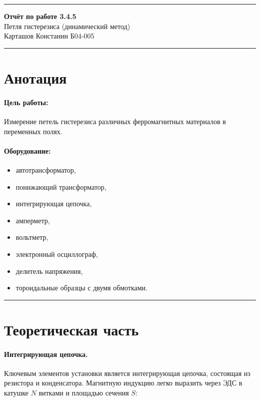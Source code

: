 \documentclass[a4paper,12pt]{article} %
\begin{document}


\hrule 	
\medskip
\begin{raggedright}
{\large \textbf{Отчёт по работе 3.4.5}}
\\
\medskip
{\Large Петля гистерезиса (динамический метод)} 
\\
\medskip
{\large Карташов Констанин Б04-005}
\medskip
\hrule
\medskip
\end{raggedright}


\section{Анотация}

\paragraph{Цель работы:} 
Измерение петель гистерезиса различных ферромагнитных материалов в переменных полях.

\paragraph{Оборудование:}
\begin{itemize}
\renewcommand{\labelitemi}{$\triangleright$}
\itemsep0em
\item автотрансформатор,
\item понижающий трансформатор,
\item интегрирующая цепочка,
\item амперметр,
\item вольтметр,
\item электронный осциллограф,
\item делитель напряжения,
\item тороидальные образцы с двумя обмотками.
\end{itemize}


\medskip\hrule\medskip

\section{Теоретическая часть}

\paragraph{Интегрирующая цепочка.} Ключевым элементов установки является интегрирующая цепочка, состоящая из резистора и конденсатора. Магнитную индукцию легко выразить через ЭДС в катушке $N$ витками и площадью сечения $S$:
\end{document}
